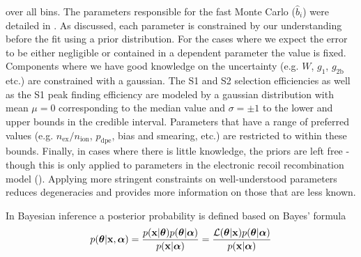 \noindent over all bins.  The parameters
responsible for the fast Monte Carlo ($\hat{b}_i$) were detailed in
.  As
discussed, each parameter is constrained by our understanding before
the fit using a prior distribution.  For the cases where we expect the error to be either negligible or contained in a dependent parameter
the value is fixed.  Components where we have good knowledge on the uncertainty (e.g. $W$, $g_1$, $g_{2\mathrm{b}}$ etc.) are constrained
with a gaussian.  The S1 and S2 selection efficiencies as well as the S1 peak finding efficiency are modeled by a gaussian
distribution with
mean $\mu = 0$ corresponding to the median value and $\sigma = \pm 1$ to the lower and upper bounds in the credible interval.  Parameters
that have a range of preferred values (e.g. $n_{\mathrm{ex}} / n_{\mathrm{ion}}$, $p_{\mathrm{dpe}}$,
bias and smearing, etc.) are restricted to within these bounds.  Finally, in cases where there is little knowledge, the priors
are left free - though this is only applied to parameters in the electronic recoil recombination model
().  Applying more stringent constraints on well-understood parameters reduces
degeneracies and provides more information on those that are less known.

In Bayesian inference a posterior probability is defined based on Bayes' formula
\begin{equation}
p(\boldsymbol{\theta}|\mathbf{x}, \boldsymbol{\alpha}) = \frac{p(\mathbf{x}|\boldsymbol{\theta})
p(\boldsymbol{\theta}|\boldsymbol{\alpha})}{p(\mathbf{x}|\boldsymbol{\alpha})} = \frac{\mathcal{L}(\boldsymbol{\theta}|\mathbf{x})
p(\boldsymbol{\theta}|\boldsymbol{\alpha})}{p(\mathbf{x}|\boldsymbol{\alpha})}
\end{equation}

